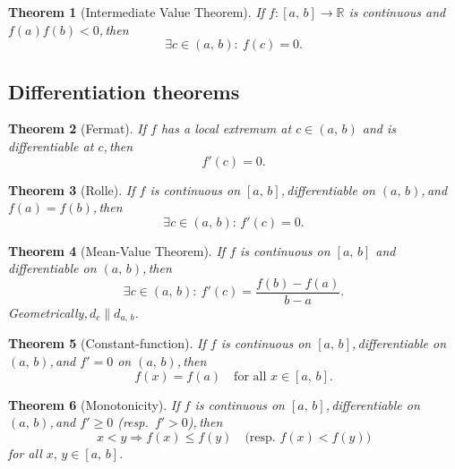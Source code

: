 \documentclass[11pt,reqno]{amsart}
\providecommand{\R}{\mathbb{R}}
\newcommand{\comma}{,\,\allowbreak}
\theoremstyle{redplain}
\newtheorem{theorem}{Theorem}
\begin{document}
\begin{theorem}[Intermediate Value Theorem]
	\label{thm:ivt}
	If $f:[a\comma b]\to\R$ is continuous and $f(a)f(b)<0$\comma then
	\begin{equation}\label{eq:ivt}
	\exists c\in(a\comma b):\ f(c)=0.
	\end{equation}
\end{theorem}

\subsection{Differentiation theorems}

\begin{theorem}[Fermat]
	\label{thm:fermat}
	If $f$ has a local extremum at $c\in(a\comma b)$ and is differentiable at $c$\comma then
	\begin{equation}\label{eq:fermat}
	f'(c)=0.
	\end{equation}
\end{theorem}

\begin{theorem}[Rolle]
	\label{thm:rolle}
	If $f$ is continuous on $[a\comma b]$\comma differentiable on $(a\comma b)$\comma and $f(a)=f(b)$\comma then \begin{equation}\exists c\in(a\comma b):\,f'(c)=0.\end{equation}
\end{theorem}

\begin{theorem}[Mean-Value Theorem]
	\label{thm:mvt}
	If $f$ is continuous on $[a\comma b]$ and differentiable on $(a\comma b)$\comma then
	\begin{equation}\label{eq:mvt}
	\exists c\in(a\comma b):\ f'(c)=\frac{f(b)-f(a)}{b-a}.
	\end{equation}
	Geometrically\comma $d_c\parallel d_{a\comma b}$.
\end{theorem}

\begin{theorem}[Constant-function]
	\label{thm:const}
	If $f$ is continuous on $[a\comma b]$\comma differentiable on $(a\comma b)$\comma and $f'=0$ on $(a\comma b)$\comma then
	\begin{equation}\label{eq:const}
	f(x)=f(a)\quad\text{for all }x\in[a\comma b].
	\end{equation}
\end{theorem}

\begin{theorem}[Monotonicity]
	\label{thm:monotone}
	If $f$ is continuous on $[a\comma b]$\comma differentiable on $(a\comma b)$\comma and $f'\ge0$ (resp.\ $f'>0$)\comma then
	\begin{equation}\label{eq:monotone}
	x<y\Rightarrow f(x)\le f(y)\quad\text{(resp.\ }f(x)<f(y)\text{)}
	\end{equation}
	for all $x\comma y\in[a\comma b]$.
\end{theorem}
\end{document}

